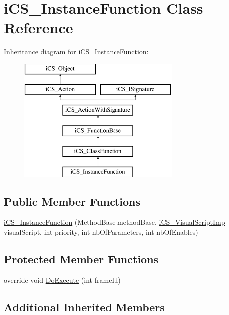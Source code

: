 \hypertarget{classi_c_s___instance_function}{\section{i\+C\+S\+\_\+\+Instance\+Function Class Reference}
\label{classi_c_s___instance_function}
}
Inheritance diagram for i\+C\+S\+\_\+\+Instance\+Function\+:\begin{figure}[H]
\begin{center}
\leavevmode
\includegraphics[height=6.000000cm]{classi_c_s___instance_function}
\end{center}
\end{figure}
\subsection*{Public Member Functions}
\begin{DoxyCompactItemize}
\item 
\hyperlink{classi_c_s___instance_function_a61cc8fb0df5ed8f8f4bec43550541dc2}{i\+C\+S\+\_\+\+Instance\+Function} (Method\+Base method\+Base, \hyperlink{classi_c_s___visual_script_imp}{i\+C\+S\+\_\+\+Visual\+Script\+Imp} visual\+Script, int priority, int nb\+Of\+Parameters, int nb\+Of\+Enables)
\end{DoxyCompactItemize}
\subsection*{Protected Member Functions}
\begin{DoxyCompactItemize}
\item 
override void \hyperlink{classi_c_s___instance_function_ab54d73226633adbd5dcdcb4f7e25b816}{Do\+Execute} (int frame\+Id)
\end{DoxyCompactItemize}
\subsection*{Additional Inherited Members}


